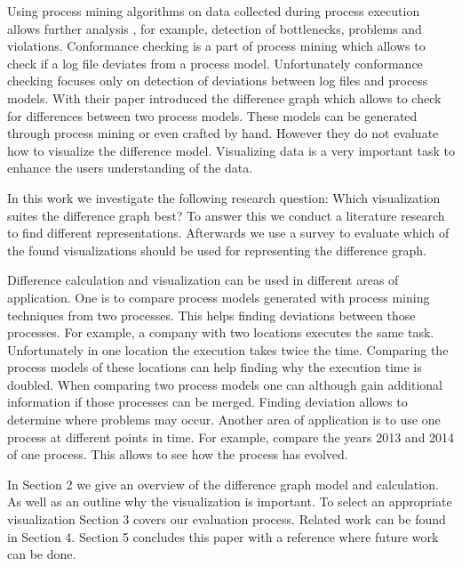 \documentclass{llncs}
\begin{document}
\begin{keywords}
Using process mining algorithms on data collected during process execution allows further analysis \cite{lit:PMDiscoveryConformanceEnhancement}, for example, detection of bottlenecks, problems and violations. Conformance checking \cite{lit:ConformanceCheckingOfProcesses} is a part of process mining which allows to check if a log file deviates from a process model. Unfortunately conformance checking focuses only on detection of deviations between log files and process models. With their paper \cite{lit:VisuApprDiffAnalysis} introduced the difference graph which allows to check for differences between two process models. These models can be generated through process mining or even crafted by hand. 
However they do not evaluate how to visualize the difference model. Visualizing data is a very important task to enhance the users understanding of the data. 

In this work we investigate the following research question: Which visualization suites the difference graph best? To answer this we conduct a literature research to find different representations. Afterwards we use a survey to evaluate which of the found visualizations should be used for representing the difference graph.

Difference calculation and visualization can be used in different areas of application. One is to compare process models generated with process mining techniques from two processes. This helps finding deviations between those processes. For example, a company with two locations executes the same task. Unfortunately in one location the execution takes twice the time. Comparing the process models of these locations can help finding why the execution time is doubled. When comparing two process models one can although gain additional information if those processes can be merged. Finding deviation allows to determine where problems may occur. Another area of application is to use one process at different points in time. For example, compare the years 2013 and 2014 of one process. This allows to see how the process has evolved.

In Section 2 we give an overview of the difference graph model and calculation. As well as an outline why the visualization is important. To select an appropriate visualization Section 3 covers our evaluation process. Related work can be found in Section 4. Section 5 concludes this paper with a reference where future work can be done.



\end{keywords}
\end{document}
